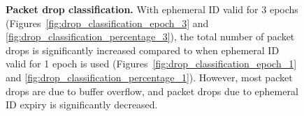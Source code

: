 \documentclass[11pt]{article}
\begin{document}
\begin{figure}[h!]
{\label{fig:drop_classification_percentage_1}
}
\caption{{\bf Packet drop classification.}
With ephemeral ID valid for 3 epochs (Figures~\ref{fig:drop_classification_epoch_3} and \ref{fig:drop_classification_percentage_3}),  
the total number of packet drops is significantly increased compared to when ephemeral ID valid for 1 epoch is used (Figures~\ref{fig:drop_classification_epoch_1} and \ref{fig:drop_classification_percentage_1}).
However, most packet drops are due to buffer overflow, and packet drops due to ephemeral ID expiry is significantly decreased. 
}
\label{fig:drop_classification}
\end{figure}
\end{document}
